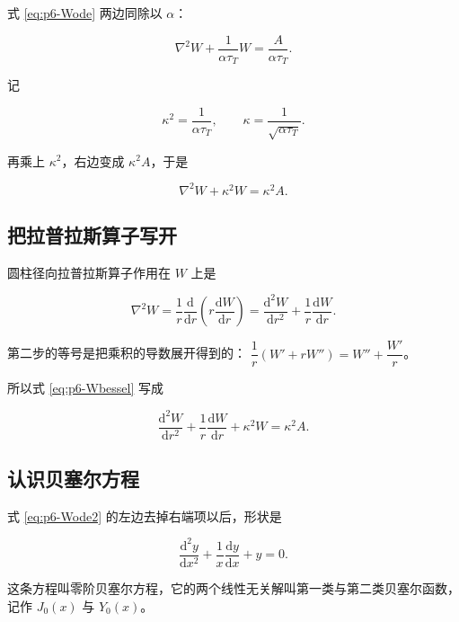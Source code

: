 式 \eqref{eq:p6-Wode} 两边同除以 $\alpha$：

\begin{equation}
\nabla^2W+\frac{1}{\alpha\tau_T}W=\frac{A}{\alpha\tau_T}.
\end{equation}

记

\begin{equation}
\kappa^2=\frac{1}{\alpha\tau_T},
\qquad \kappa=\frac{1}{\sqrt{\alpha\tau_T}} .
\label{eq:p6-kappa}
\end{equation}

再乘上 $\kappa^2$，右边变成 $\kappa^2A$，于是

\begin{equation}
\nabla^2W+\kappa^2W=\kappa^2A .
\label{eq:p6-Wbessel}
\end{equation}

\subsection{把拉普拉斯算子写开}

圆柱径向拉普拉斯算子作用在 $W$ 上是

\begin{equation}
\nabla^2W=\frac{1}{r}\frac{\mathrm{d}}{\mathrm{d}r}\left(r\frac{\mathrm{d}W}{\mathrm{d}r}\right)
=\frac{\mathrm{d}^2W}{\mathrm{d}r^2}+\frac{1}{r}\frac{\mathrm{d}W}{\mathrm{d}r}.
\end{equation}

第二步的等号是把乘积的导数展开得到的：
$\dfrac{1}{r}\left(W'+rW''\right)=W''+\dfrac{W'}{r}$。

所以式 \eqref{eq:p6-Wbessel} 写成

\begin{equation}
\frac{\mathrm{d}^2W}{\mathrm{d}r^2}+\frac{1}{r}\frac{\mathrm{d}W}{\mathrm{d}r}+\kappa^2W=\kappa^2A .
\label{eq:p6-Wode2}
\end{equation}

\subsection{认识贝塞尔方程}

式 \eqref{eq:p6-Wode2} 的左边去掉右端项以后，形状是

\begin{equation}
\frac{\mathrm{d}^2y}{\mathrm{d}x^2}+\frac{1}{x}\frac{\mathrm{d}y}{\mathrm{d}x}+y=0 .
\label{eq:p6-bessel0}
\end{equation}

这条方程叫零阶贝塞尔方程，它的两个线性无关解叫第一类与第二类贝塞尔函数，
记作 $J_0(x)$ 与 $Y_0(x)$。

